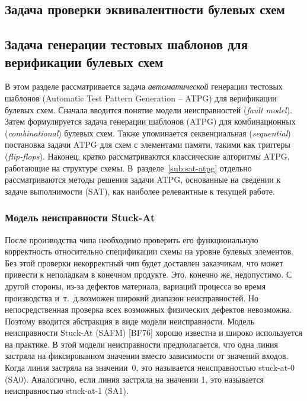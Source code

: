\subsection{Задача проверки эквивалентности булевых схем}
\label{sub:lec}



\subsection{Задача генерации тестовых шаблонов для верификации булевых схем}
\label{sub:atpg}

В этом разделе рассматривается задача \textit{автоматической} генерации тестовых шаблонов (Automatic Test Pattern Generation \--- ATPG) для верификации булевых схем.
Сначала вводится понятие модели неисправностей (\textit{fault model}).
Затем формулируется задача генерации шаблонов (ATPG) для комбинационных (\textit{combinational}) булевых схем.
Также упоминается секвенциальная (\textit{sequential}) постановка задачи ATPG для схем с элементами памяти, такими как триггеры (\textit{flip-flops}).
Наконец, кратко рассматриваются классические алгоритмы ATPG, работающие на структуре схемы.
В~разделе~\ref{sub:sat-atpg} отдельно рассматриваются методы решения задачи ATPG, основанные на сведении к задаче выполнимости (SAT), как наиболее релевантные к текущей работе.

\subsubsection{Модель неисправности Stuck-At}

После производства чипа необходимо проверить его функциональную корректность относительно спецификации схемы на уровне булевых элементов.
Без этой проверки некорректный чип будет доставлен заказчикам, что может привести к неполадкам в конечном продукте. Это, конечно же, недопустимо.
С другой стороны, из-за дефектов материала, вариаций процесса во время производства и~т.\@~д.\@ возможен широкий диапазон неисправностей.
Но непосредственная проверка всех возможных физических дефектов невозможна.
Поэтому вводится абстракция в виде модели неисправности.
Модель неисправности Stuck-At (SAFM) [BF76] хорошо известна и широко используется на практике.
В этой модели неисправности предполагается, что одна линия застряла на фиксированном значении вместо зависимости от значений входов.
Когда линия застряла на значении~0, это называется неисправностью stuck-at-0 (SA0).
Аналогично, если линия застряла на значении 1, это называется неисправностью stuck-at-1 (SA1).

